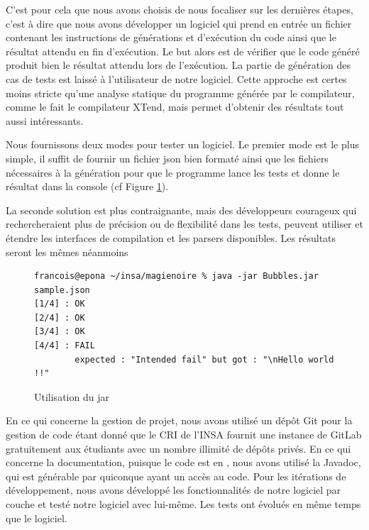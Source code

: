 C'est pour cela que nous avons choisis de nous focaliser sur les dernières étapes, c'est à dire que
nous avons développer un logiciel qui prend en entrée un fichier contenant les instructions de générations et d’exécution du code ainsi que le résultat
attendu en fin d’exécution. Le but alors est de vérifier que le code généré produit bien le résultat attendu lors de l’exécution. La partie de génération
des cas de tests est laissé à l'utilisateur de notre logiciel. Cette approche est certes moins stricte qu'une analyse statique du programme générée par
le compilateur, comme le fait le compilateur XTend, mais permet d'obtenir des résultats tout aussi intéressants.

Nous fournissons deux modes pour tester un logiciel. Le premier mode est le plus simple, il suffit de fournir un fichier json bien formaté
ainsi que les fichiers nécessaires à la génération pour que le programme lance les tests et donne le résultat dans la console (cf Figure \ref{mode1}).

La seconde solution est plus contraignante, mais des développeurs courageux qui rechercheraient plus de précision ou de flexibilité dans les tests,
peuvent utiliser et étendre les interfaces de compilation et les parsers disponibles. Les résultats seront les mêmes néanmoins

\begin{figure}[!ht]
\begin{lstlisting}
francois@epona ~/insa/magienoire % java -jar Bubbles.jar sample.json
[1/4] : OK
[2/4] : OK
[3/4] : OK
[4/4] : FAIL
        expected : "Intended fail" but got : "\nHello world !!"
\end{lstlisting}
\caption{Utilisation du jar}
\label{mode1}
\end{figure}


En ce qui concerne la gestion de projet, nous avons utilisé un dépôt Git pour la gestion de code étant donné que le CRI de l'INSA fournit une
instance de GitLab gratuitement aux étudiants avec un nombre illimité de dépôts privés. En ce qui concerne la documentation, puisque le code
est en \jv, nous avons utilisé la Javadoc, qui est générable par quiconque ayant un accès au code. Pour les itérations de développement,
nous avons développé les fonctionnalités de notre logiciel par couche et testé notre logiciel avec lui-même. Les tests ont évolués en même temps que le logiciel.
